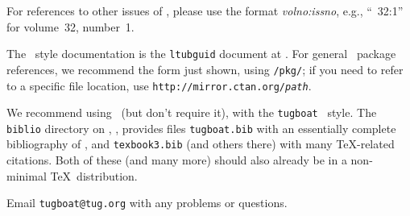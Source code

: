 \documentclass{ltugboat}
\begin{document}
For references to other issues of \TUB, please use the format
\textsl{volno:issno}, e.g., ``\TUB\ 32:1'' for volume~32, number~1.

The \TUB\ style documentation is the \texttt{ltubguid} document at
. For general \CTAN\ package references, we
recommend the form just shown, using \texttt{/pkg/}; if you need to
refer to a specific file location, use
\texttt{http://mirror.ctan.org/\textsl{path}}.

We recommend using \BibTeX\ (but don't require it), with the
\texttt{tugboat} \BibTeX\ style. The \texttt{biblio} directory on \CTAN,
, provides files \texttt{tugboat.bib} with
an essentially complete bibliography of \TUB, and \texttt{texbook3.bib}
(and others there) with many \TeX-related citations. Both of these (and
many more) should also already be in a non-minimal \TeX\ distribution.

Email \verb|tugboat@tug.org| with any problems or questions.


\nocite{book-minimal}      %

\makesignature
\end{document}
